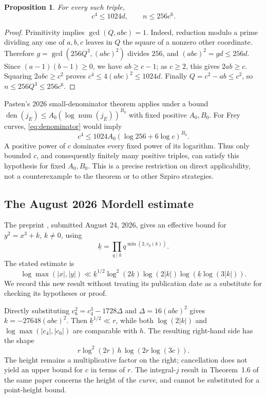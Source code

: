 \documentclass[11pt]{amsart}
\newtheorem{proposition}[theorem]{Proposition}
\theoremstyle{definition}
\theoremstyle{remark}
\newcommand{\den}{\operatorname{den}}
\newcommand{\num}{\operatorname{num}}
\begin{document}
\begin{proposition}\label{prop:denominator}
For every such triple,
\begin{equation}\label{eq:denominator}
 c^4\le1024d,\qquad n\le256c^6.
\end{equation}
\end{proposition}
\begin{proof}
Primitivity implies $\gcd(Q,abc)=1$. Indeed, reduction modulo a prime
dividing any one of $a,b,c$ leaves in $Q$ the square of a nonzero other
coordinate. Therefore $g=\gcd(256Q^3,(abc)^2)$ divides $256$, and
$(abc)^2=gd\le256d$.
Since $(a-1)(b-1)\ge0$, we have $ab\ge c-1$; as $c\ge2$, this gives
$2ab\ge c$. Squaring $2abc\ge c^2$ proves
$c^4\le4(abc)^2\le1024d$.
Finally $Q=c^2-ab\le c^2$, so $n\le256Q^3\le256c^6$.
\end{proof}

Pasten's 2026 small-denominator theorem
\cite[Theorem~1.2]{PastenSmall} applies under a bound
$\den(j_E)\le A_0(\log\num(j_E))^{B_0}$ with fixed positive
$A_0,B_0$. For Frey curves, \eqref{eq:denominator} would imply
\[
 c^4\le1024A_0(\log256+6\log c)^{B_0}.
\]
A positive power of $c$ dominates every fixed power of its logarithm.
Thus only bounded $c$, and consequently finitely many positive triples,
can satisfy this hypothesis for fixed $A_0,B_0$.
This is a precise restriction on direct applicability, not a
counterexample to the theorem or to other Szpiro strategies.

\subsection{The August 2026 Mordell estimate}
The preprint \cite[Theorem~1.3]{PastenNew}, submitted August 24, 2026,
gives an effective bound for $y^2=x^3+k$, $k\ne0$, using
\[
 \underline{k}=\prod_{q\mid k}q^{\min(2,v_q(k))}.
\]
The stated estimate is
\begin{equation}\label{eq:pasten}
 \log\max(|x|,|y|)\ll
 \underline{k}^{1/2}\log^2(2\underline{k})\log(2|k|)
 \log\!\left(\underline{k}\log(3|k|)\right).
\end{equation}
We record this new result without treating its publication date as a
substitute for checking its hypotheses or proof.

Directly substituting $c_6^2=c_4^3-1728\Delta$ and
$\Delta=16(abc)^2$ gives $k=-27648(abc)^2$.
Then $\underline{k}^{1/2}\ll r$, while both
$\log(2|k|)$ and $\log\max(|c_4|,|c_6|)$ are comparable with $h$.
The resulting right-hand side has the shape
\[
 r\log^2(2r)\,h\,\log(2r\log(3c)).
\]
The height remains a multiplicative factor on the right; cancellation
does not yield an upper bound for $c$ in terms of $r$.
The integral-$j$ result in Theorem~1.6 of the same paper concerns the
height of the \emph{curve}, and cannot be substituted for a point-height bound.
\end{document}
